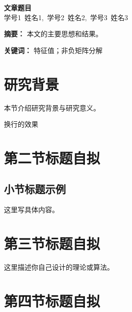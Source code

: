 \documentclass[12pt,a4paper]{article}
\begin{document}
\begin{center}
    {\LARGE \textbf{文章题目}} \\[1em]

    学号1\ 姓名1,\ 学号2\ 姓名2,\ 学号3\ 姓名3
\end{center}

\vspace{1em}

\noindent\textbf{摘要：}
本文的主要思想和结果。

\vspace{0.5em}

\noindent\textbf{关键词：}
特征值；非负矩阵分解

\vspace{1.5em}


\section{研究背景}

本节介绍研究背景与研究意义。

换行的效果
\section{第二节标题自拟}

\subsection{小节标题示例}

这里写具体内容。

\section{第三节标题自拟}

这里描述你自己设计的理论或算法。

\section{第四节标题自拟}
\end{document}
